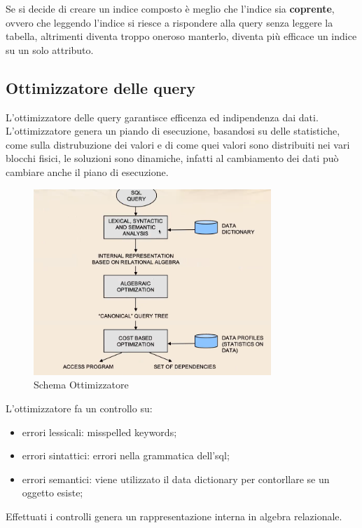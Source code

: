 \documentclass[12pt]{article}
\begin{document}
Se si decide di creare un indice composto \`e meglio che l'indice sia \textbf{coprente}, ovvero che leggendo l'indice si riesce a rispondere alla query senza leggere la tabella, altrimenti diventa troppo oneroso manterlo, diventa pi\`u efficace un indice su un solo attributo.



\subsection{Ottimizzatore delle query}
L'ottimizzatore delle query garantisce efficenza ed indipendenza dai dati. L'ottimizzatore genera un piando di esecuzione, basandosi su delle statistiche, come sulla distrubuzione dei valori e di come quei valori sono distribuiti nei vari blocchi fisici, le soluzioni sono dinamiche, infatti al cambiamento dei dati pu\`o cambiare anche il piano di esecuzione.
\begin{figure}[H]
    \centering
    \includegraphics[width=0.8\textwidth]{schema-ottimizzatore.png}
    \caption{Schema Ottimizzatore}
    \label{fig:schema-ottimizzatore}
\end{figure}

L'ottimizzatore fa un controllo su:
\begin{itemize}
    \item errori lessicali: misspelled keywords;
    \item errori sintattici: errori nella grammatica dell'sql;
    \item errori semantici: viene utilizzato il data dictionary per contorllare se un oggetto esiste;
\end{itemize}
Effettuati i controlli genera un rappresentazione interna in algebra relazionale.
\end{document}
